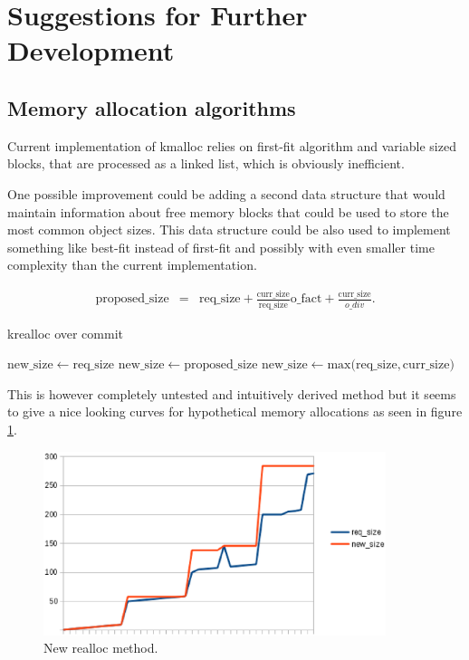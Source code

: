 \section{Suggestions for Further Development}

\subsection{Memory allocation algorithms}

Current implementation of kmalloc relies on first-fit algorithm and variable
sized blocks, that are processed as a linked list, which is obviously inefficient.

One possible improvement could be adding a second data structure that would
maintain information about free memory blocks that could be used to store the
most common object sizes. This data structure could be also used to implement
something like best-fit instead of first-fit and possibly with even smaller
time complexity than the current implementation.

\begin{eqnarray}
\mathrm{proposed\_size} &=& \mathrm{req\_size}
  + \frac{\mathrm{curr\_size}}{\mathrm{req\_size}} \mathrm{o\_fact}
  + \frac{\mathrm{curr\_size}}{o\_div}.
\end{eqnarray}

\begin{algorithm}
  \caption{krealloc over commit}
  \label{algo:realloc_oc}
  \begin{algorithmic}
        \State $\mathrm{new\_size} \gets \mathrm{req\_size}$
      \Else
          \State $\mathrm{new\_size} \gets \mathrm{proposed\_size}$
        \Else
          \State $\mathrm{new\_size} \gets \mathrm{max(req\_size, curr\_size})$
        \EndIf
      \EndIf
  \end{algorithmic}
\end{algorithm}

This is however completely untested and intuitively derived method but it
seems to give a nice looking curves for hypothetical memory allocations as seen
in figure \ref{figure:realloc}.

\begin{figure}
  \center
  \includegraphics[width=10cm]{pics/realloc}
  \caption{New realloc method.}
  \label{figure:realloc}
\end{figure}
